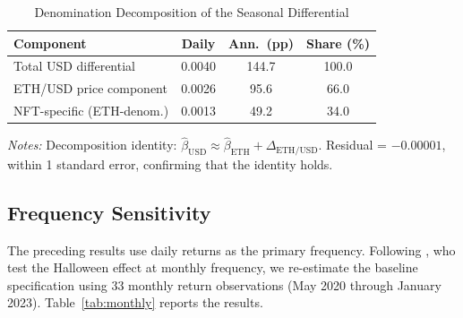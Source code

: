 \documentclass[12pt,a4paper]{article}
\begin{document}
\begin{table}[htbp]
\centering
\begin{threeparttable}
\caption{Denomination Decomposition of the Seasonal Differential}
\label{tab:decomposition}

\begin{tabular*}{\textwidth}{@{\extracolsep{\fill}} lccc}
\toprule
Component & Daily & Ann.\ (pp) & Share (\%) \\
\midrule
Total USD differential     & 0.0040 & 144.7 & 100.0 \\
ETH/USD price component    & 0.0026 & 95.6  & 66.0  \\
NFT-specific (ETH-denom.)  & 0.0013 & 49.2  & 34.0  \\
\bottomrule
\end{tabular*}

\begin{tablenotes}[flushleft]
\footnotesize
\item \textit{Notes:} Decomposition identity:
$\hat{\beta}_{\mathrm{USD}} \approx \hat{\beta}_{\mathrm{ETH}} + \Delta_{\mathrm{ETH/USD}}$.
Residual = $-0.00001$, within 1 standard error, confirming that the identity holds.
\end{tablenotes}

\end{threeparttable}
\end{table}



\subsection{Frequency Sensitivity}\label{sec:frequency}

The preceding results use daily returns as the primary frequency. Following \citet{BoumanJacobsen2002}, who test the Halloween effect at monthly frequency, we re-estimate the baseline specification using 33 monthly return observations (May 2020 through January 2023). Table~\ref{tab:monthly} reports the results.
\end{document}
